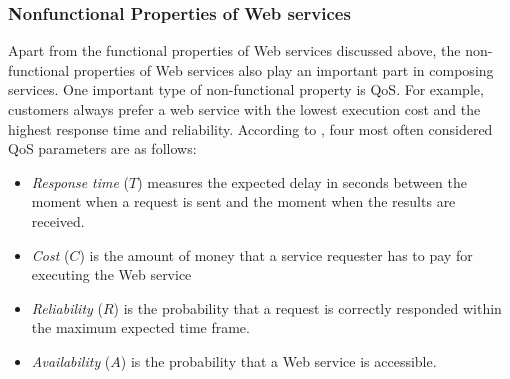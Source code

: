 
\subsubsection{Nonfunctional Properties of Web services}\label{nonfunctional}
Apart from the functional properties of Web services discussed above, the non-functional properties of Web services also play an important part in composing services. One important type of non-functional property is QoS. For example, customers always prefer a web service with the lowest execution cost and the highest response time and reliability. According to \cite{zeng2003quality}, four most often considered QoS parameters are as follows:
\begin{itemize}
\item \textit{Response time} ($T$) measures the expected delay in seconds between the moment when a request is sent and the moment when the results are received.
\item \textit{Cost} ($C$) is the amount of money that a service requester has to pay for executing the Web service
\item \textit{Reliability} ($R$) is the probability that a request is correctly responded within the maximum expected time frame.
\item \textit{Availability} ($A$) is the probability that a Web service is accessible.
\end{itemize}

